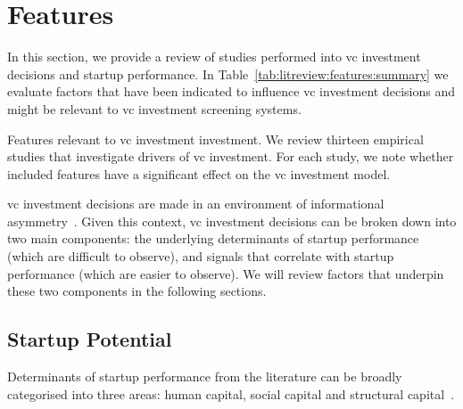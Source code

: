 \documentclass[../thesis/thesis.tex]{subfiles}
\begin{document}
\section{Features}

In this section, we provide a review of studies performed into \gls{vc} investment decisions and startup performance. In Table~\ref{tab:litreview:features:summary} we evaluate factors that have been indicated to influence \gls{vc} investment decisions and might be relevant to \gls{vc} investment screening systems.

\begin{table}[!htb]
    \centering
    \scalebox{1}{
        
    }
    \caption[Features relevant to \gls{vc} investment screening]{Features relevant to \gls{vc} investment investment. We review thirteen empirical studies that investigate drivers of \gls{vc} investment. For each study, we note whether included features have a significant effect on the \gls{vc} investment model.}
    \label{tab:litreview:features:summary}
\end{table}

\Gls{vc} investment decisions are made in an environment of informational asymmetry~\cite{ahlers2015}. Given this context, \gls{vc} investment decisions can be broken down into two main components: the underlying determinants of startup performance (which are difficult to observe), and signals that correlate with startup performance (which are easier to observe). We will review factors that underpin these two components in the following sections.

\subsection{Startup Potential}

Determinants of startup performance from the literature can be broadly categorised into three areas: human capital, social capital and structural capital~\cite{baum2004, ahlers2015}.
\end{document}
